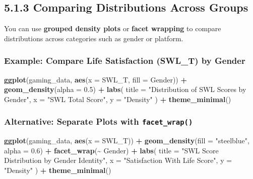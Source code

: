 \documentclass[
]{book}
\newenvironment{Shaded}{\begin{snugshade}}{\end{snugshade}}
\newcommand{\AttributeTok}[1]{\textcolor[rgb]{0.13,0.29,0.53}{#1}}
\newcommand{\FloatTok}[1]{\textcolor[rgb]{0.00,0.00,0.81}{#1}}
\newcommand{\FunctionTok}[1]{\textcolor[rgb]{0.13,0.29,0.53}{\textbf{#1}}}
\newcommand{\NormalTok}[1]{#1}
\newcommand{\SpecialCharTok}[1]{\textcolor[rgb]{0.81,0.36,0.00}{\textbf{#1}}}
\newcommand{\StringTok}[1]{\textcolor[rgb]{0.31,0.60,0.02}{#1}}
\begin{document}
\subsection{5.1.3 Comparing Distributions Across Groups}\label{comparing-distributions-across-groups}

You can use \textbf{grouped density plots} or \textbf{facet wrapping} to compare distributions across categories such as gender or platform.

\subsubsection{Example: Compare Life Satisfaction (SWL\_T) by Gender}\label{example-compare-life-satisfaction-swl_t-by-gender}

\begin{Shaded}
\begin{Highlighting}[]
\FunctionTok{ggplot}\NormalTok{(gaming\_data, }\FunctionTok{aes}\NormalTok{(}\AttributeTok{x =}\NormalTok{ SWL\_T, }\AttributeTok{fill =}\NormalTok{ Gender)) }\SpecialCharTok{+}
  \FunctionTok{geom\_density}\NormalTok{(}\AttributeTok{alpha =} \FloatTok{0.5}\NormalTok{) }\SpecialCharTok{+}
  \FunctionTok{labs}\NormalTok{(}
    \AttributeTok{title =} \StringTok{"Distribution of SWL Scores by Gender"}\NormalTok{,}
    \AttributeTok{x =} \StringTok{"SWL Total Score"}\NormalTok{,}
    \AttributeTok{y =} \StringTok{"Density"}
\NormalTok{  ) }\SpecialCharTok{+}
  \FunctionTok{theme\_minimal}\NormalTok{()}
\end{Highlighting}
\end{Shaded}

\subsubsection{\texorpdfstring{Alternative: Separate Plots with \texttt{facet\_wrap()}}{Alternative: Separate Plots with facet\_wrap()}}\label{alternative-separate-plots-with-facet_wrap}

\begin{Shaded}
\begin{Highlighting}[]
\FunctionTok{ggplot}\NormalTok{(gaming\_data, }\FunctionTok{aes}\NormalTok{(}\AttributeTok{x =}\NormalTok{ SWL\_T)) }\SpecialCharTok{+}
  \FunctionTok{geom\_density}\NormalTok{(}\AttributeTok{fill =} \StringTok{"steelblue"}\NormalTok{, }\AttributeTok{alpha =} \FloatTok{0.6}\NormalTok{) }\SpecialCharTok{+}
  \FunctionTok{facet\_wrap}\NormalTok{(}\SpecialCharTok{\textasciitilde{}}\NormalTok{ Gender) }\SpecialCharTok{+}
  \FunctionTok{labs}\NormalTok{(}
    \AttributeTok{title =} \StringTok{"SWL Score Distribution by Gender Identity"}\NormalTok{,}
    \AttributeTok{x =} \StringTok{"Satisfaction With Life Score"}\NormalTok{,}
    \AttributeTok{y =} \StringTok{"Density"}
\NormalTok{  ) }\SpecialCharTok{+}
  \FunctionTok{theme\_minimal}\NormalTok{()}
\end{Highlighting}
\end{Shaded}
\end{document}
